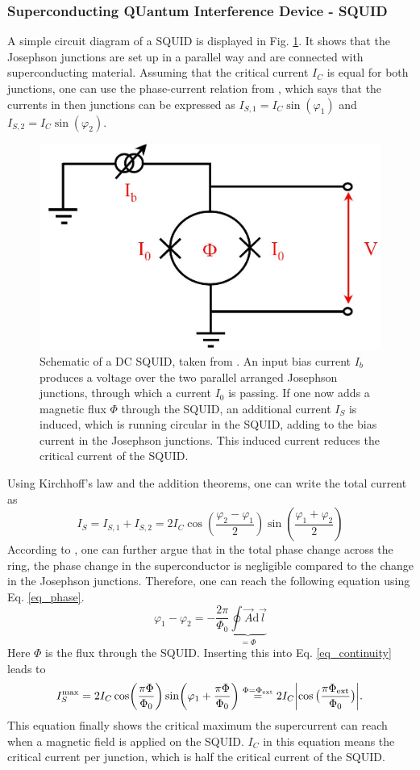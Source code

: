 \documentclass[a4paper,10pt]{article}
\newcommand{\dif}{\mathrm{d}}
\begin{document}
\subsubsection*{Superconducting QUantum Interference Device - SQUID}
A simple circuit diagram of a SQUID is displayed in Fig. \ref{fig_squid}. It shows that the Josephson junctions are set up in a parallel way and are connected with superconducting material. Assuming that the critical current $I_C$ is equal for both junctions, one can use the phase-current relation from \cite{grossmarx}, which says that the currents in then junctions can be expressed as $I_{S,1}=I_C \sin(\varphi_1)$ and $I_{S,2} = I_C \sin(\varphi_2)$.
\begin{figure}[htp!]
    \centering
    \includegraphics[width = 0.6 \textwidth]{SQUID_IV.jpg}
    \caption{Schematic of a DC SQUID, taken from \cite{squid_circuit}. An input bias current $I_b$ produces a voltage over the two parallel arranged Josephson junctions, through which a current $I_0$ is passing. If one now adds a magnetic flux $\Phi$ through the SQUID, an additional current $I_S$ is induced, which is running circular in the SQUID, adding to the bias current in the Josephson junctions. This induced current reduces the critical current of the SQUID.}
    \label{fig_squid}
\end{figure}
Using Kirchhoff's law and the addition theorems, one can write the total current as 
\begin{equation}
    \label{eq_continuity}
    I_S = I_{S,1} + I_{S,2} = 2 I_C \cos(\frac{\varphi_2 - \varphi_1}{2}) \sin(\frac{\varphi_1 + \varphi_2}{2})
\end{equation}
According to \cite{grossmarx}, one can further argue that in the total phase change across the ring, the phase change in the superconductor is negligible compared to the change in the Josephson junctions. Therefore, one can reach the following equation using Eq. \ref{eq_phase}. 
\begin{equation}
    \varphi_1 - \varphi_2 = - \frac{2 \pi}{\Phi_0} \underbrace{ \oint \vec{A} \dif \vec{l} }_{= \Phi}
\end{equation}
Here $\Phi$ is the flux through the SQUID. Inserting this into Eq. \ref{eq_continuity} leads to 
\begin{equation}
    I_S^\mathrm{max} = 2 I_C \cos(\frac{\pi \Phi}{\Phi_0}) \sin(\varphi_1 + \frac{\pi \Phi}{\Phi_0}) \stackrel{\Phi = \Phi_\mathrm{ext}}{=} 2 I_C \abs{\cos \big( \frac{\pi \Phi_\mathrm{ext}}{\Phi_0} \big)}.
\end{equation}
This equation finally shows the critical maximum the supercurrent can reach when a magnetic field is applied on the SQUID. $I_C$ in this equation means the critical current per junction, which is half the critical current of the SQUID. 
\end{document}
